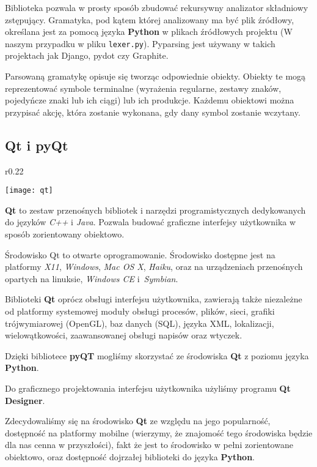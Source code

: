 Biblioteka pozwala w prosty sposób zbudować rekursywny analizator składniowy zstępujący.
Gramatyka, pod kątem której analizowany ma być plik źródłowy, określana jest za pomocą języka \textbf{Python} w plikach źródłowych projektu (W naszym przypadku w pliku \texttt{lexer.py}).
Pyparsing jest używany w takich projektach jak Django, pydot czy Graphite.

Parsowaną gramatykę opisuje się tworząc odpowiednie obiekty.
Obiekty te mogą reprezentować symbole terminalne (wyrażenia regularne, zestawy znaków, pojedyńcze znaki lub ich ciągi) lub ich produkcje.
Każdemu obiektowi można przypisać akcję, która zostanie wykonana, gdy dany symbol zostanie wczytany.

\subsection{Qt i pyQt}
\begin{wrapfigure}{r}{0.22\textwidth}
  \begin{center}
    \texttt{[image: qt]}
  \end{center}
\end{wrapfigure}
\textbf{Qt} to zestaw przenośnych bibliotek i narzędzi programistycznych dedykowanych do języków \emph{C++} i \emph{Java}.
Pozwala budować graficzne interfejsy użytkownika w sposób zorientowany obiektowo.

Środowisko Qt to otwarte oprogramowanie.
Środowisko dostępne jest na platformy \emph{X11}, \emph{Windows}, \emph{Mac OS X}, \emph{Haiku}, oraz na urządzeniach przenośnych opartych na linuksie, \emph{Windows CE} i~\emph{Symbian}.

Biblioteki \textbf{Qt} oprócz obsługi interfejsu użytkownika, zawierają także niezależne od platformy systemowej moduły obsługi procesów, plików, sieci, grafiki trójwymiarowej (OpenGL), baz danych (SQL), języka XML, lokalizacji, wielowątkowości, zaawansowanej obsługi napisów oraz wtyczek.

Dzięki bibliotece \textbf{pyQT} mogliśmy skorzystać ze środowiska \textbf{Qt} z poziomu języka \textbf{Python}.

Do graficznego projektowania interfejsu użytkownika użyliśmy programu \textbf{Qt Designer}.

Zdecydowaliśmy się na środowisko \textbf{Qt} ze względu na jego popularność, dostępność na platformy mobilne (wierzymy, że znajomość tego środowiska będzie dla nas cenna w przyszłości), fakt że jest to środowisko w pełni zorientowane obiektowo, oraz dostępność dojrzałej biblioteki do języka \textbf{Python}.

